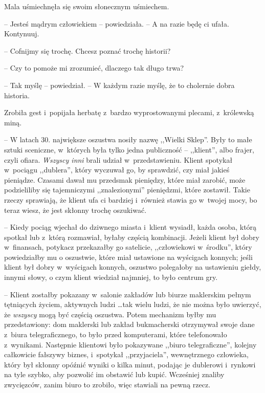 \documentclass[oneside,polish,11pt,rmheadings]{mwbk}
\begin{document}
Mala uśmiechnęła się swoim słonecznym uśmiechem. 

-- Jesteś mądrym człowiekiem -- powiedziała. -- A na razie będę ci ufała. Kontynuuj.

-- Cofnijmy się trochę. Chcesz poznać trochę historii?

-- Czy to pomoże mi zrozumieć, dlaczego tak długo trwa?

-- Tak myślę -- powiedział. -- W każdym razie myślę, że to cholernie dobra historia.

Zrobiła gest i~popijała herbatę z~bardzo wyprostowanymi plecami, z~królewską miną.

-- W latach 30. największe oszustwa nosiły nazwę ,,Wielki Sklep''. Były to małe sztuki sceniczne, w~których była tylko jedna publiczność -- ,,klient'', albo frajer, czyli ofiara. \textit{Wszyscy inni }brali udział w~przedstawieniu. Klient spotykał w~pociągu ,,dublera'', który wyczuwał go, by sprawdzić, czy miał jakieś pieniądze. Czasami dawał mu przedsmak pieniędzy, które miał zarobić, może podzieliliby się tajemniczymi ,,znalezionymi'' pieniędzmi, które zostawił. Takie rzeczy sprawiają, że klient ufa ci bardziej i~również stawia go w~twojej mocy, bo teraz wiesz, że jest skłonny trochę oszukiwać.

-- Kiedy pociąg wjechał do dziwnego miasta i~klient wysiadł, każda osoba, którą spotkał lub z~którą rozmawiał, byłaby częścią kombinacji. Jeżeli klient był dobry w~finansach, potykacz przekazałby go satelicie, ,,człowiekowi w~środku'', który powiedziałby mu o oszustwie, które miał ustawione na wyścigach konnych; jeśli klient był dobry w~wyścigach konnych, oszustwo polegałoby na ustawieniu giełdy, innymi słowy, o czym klient wiedział najmniej, to było centrum gry.

-- Klient zostałby pokazany w~salonie zakładów lub biurze maklerskim pełnym tętniących życiem, aktywnych ludzi \ldots  tak wielu ludzi, że nie można było uwierzyć, że \textit{wszyscy }mogą być częścią oszustwa. Potem mechanizm byłby mu przedstawiony: dom maklerski lub zakład bukmacherski otrzymywał swoje dane z~biura telegraficznego, to było przed komputerami, które telefonowało z~wynikami. Następnie klientowi było pokazywane ,,biuro telegraficzne'', kolejny całkowicie fałszywy biznes, i~spotykał ,,przyjaciela'', wewnętrznego człowieka, który był skłonny opóźnić wyniki o kilka minut, podając je dublerowi i~rynkowi na tyle szybko, aby pozwolić im obstawić lub kupić. Wcześniej znaliby zwycięzców, zanim biuro to zrobiło, więc stawiali na pewną rzecz.
\end{document}
